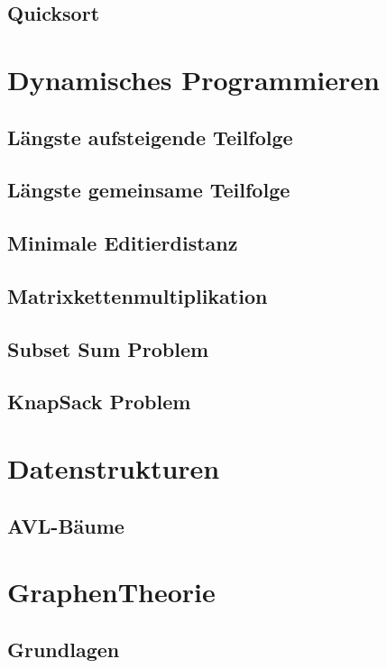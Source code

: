\documentclass[a4paper]{article}
\begin{document}
\subsection{Quicksort}

\section{Dynamisches Programmieren}

\subsection{Längste aufsteigende Teilfolge}

\subsection{Längste gemeinsame Teilfolge}

\subsection{Minimale Editierdistanz}

\subsection{Matrixkettenmultiplikation}

\subsection{Subset Sum Problem}

\subsection{KnapSack Problem}

\section{Datenstrukturen}

\subsection{AVL-Bäume}

\section{GraphenTheorie}

\subsection{Grundlagen}
\end{document}
